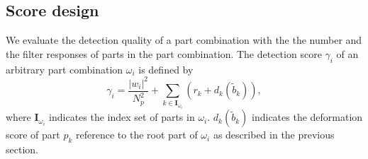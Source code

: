 \documentclass[runningheads]{llncs}
\begin{document}


\subsection{Score design}
\label{subsec:score}
We evaluate the detection quality of a part combination with the the number and the filter responses of parts in the part combination.
The detection score $\gamma_i$ of an arbitrary part combination $\omega_i$ is defined by
\begin{equation}
   \label{eq:part_detection_score}
   \gamma_i =\frac{|w_i|^2}{N_p^2}  + \sum_{k \in \mathbf{I}_{\omega_i}} \left( r_k + d_k(\tilde{b}_k) \right),
\end{equation}
where $\mathbf{I}_{\omega_i}$ indicates the index set of parts in $\omega_i$. $d_k(\tilde{b}_k)$ indicates the deformation score of part $p_k$ reference to the root part of $\omega_i$ as described in the previous section.
\end{document}

